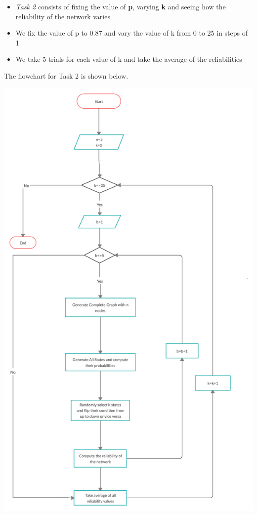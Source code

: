 \documentclass[12pt,letterpaper,titlepage,en-US]{article}
\begin{document}
\begin{itemize}
 

\item \textit{Task 2} consists of fixing the value of \textbf{p}, varying \textbf{k} and seeing how the reliability of the network varies

\item We fix the value of p to 0.87 and vary the value of k from 0 to 25 in steps of 1 

\item We take 5 trials for each value of k and take the average of the reliabilities
 \end{itemize}

The flowchart for Task 2 is shown below.

 \includegraphics[scale=0.20]{fig/task2.png}
\end{document}
